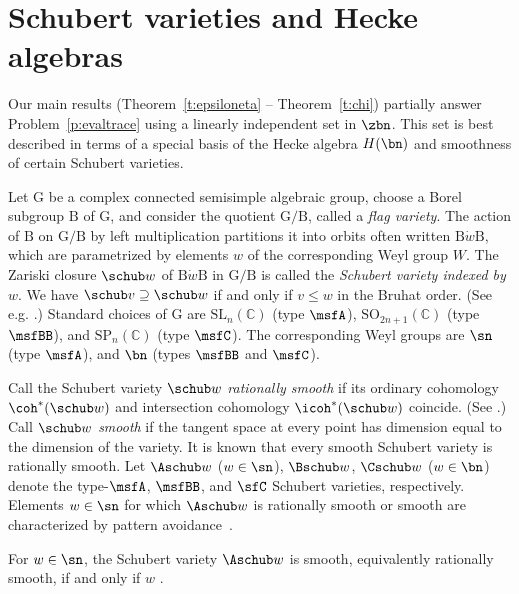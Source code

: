 \section{Schubert varieties and Hecke algebras}\label{s:schuberthecke}

Our main results (Theorem~\ref{t:epsiloneta} --
Theorem~\ref{t:chi})
partially answer
Problem~\ref{p:evaltrace} using a linearly independent set in $\zbn$.
This set is best described in terms of a special basis of the
Hecke algebra $H(\bn)$ and smoothness of certain Schubert varieties.


Let $\mathrm G$ be a complex connected semisimple algebraic group,
choose a Borel subgroup $\mathrm B$ of $\mathrm G$, and consider
the quotient
$\mathrm G/\mathrm B$,
called a {\em flag variety}.
The action of $\mathrm B$ on $\mathrm G/\mathrm B$ by left multiplication 
partitions
it
into orbits often written
$\mathrm B\dot w\mathrm B$,
which are
parametrized by elements $w$ of the corresponding Weyl group $W$.
The Zariski closure $\schub w$ of
$\mathrm B \dot w \mathrm B$
in $\mathrm G/\mathrm B$
is called the {\em Schubert variety indexed by $w$}.
We have
$\schub v \supseteq \schub w$ if and only if $v \leq w$ in the Bruhat order.
(See e.g. \cite[\S \,4.7]{BilleyLak}.)
Standard choices of $\mathrm G$
are
$\mathrm{SL}_n(\mathbb C)$
(type $\msfA$),
$\mathrm{SO}_{2n+1}(\mathbb C)$
(type $\msfBB$),
and $\mathrm{SP}_{n}(\mathbb C)$
(type $\msfC$).
The corresponding Weyl groups are $\sn$ (type $\msfA$), and
$\bn$
(types $\msfBB$ and $\msfC$).

Call the Schubert variety $\schub w$ {\em rationally smooth} if
its ordinary cohomology $\coh^*(\schub w)$ and
intersection cohomology $\icoh^*(\schub w)$ coincide.
(See \cite[Ch.\,6]{BilleyLak}.)
Call $\schub w$ {\em smooth} if the tangent space at every
point has dimension equal to the dimension of the variety.
It is known that every smooth
Schubert variety is rationally smooth.
Let $\Aschub w$ ($w \in \sn$), $\Bschub w$, $\Cschub w$ ($w \in \bn$)
denote the type-$\msfA$,
$\msfBB$, and
$\sfC$ Schubert varieties,
respectively.  Elements $w \in \sn$ for which $\Aschub w$ is rationally
smooth or smooth are characterized by pattern avoidance~\cite{LakSan}.
\begin{prop}\label{p:aavoid}
  For $w \in \sn$,
  the
  Schubert variety
  $\Aschub w$
  is smooth, equivalently rationally smooth,
  if and only if $w$ \avoidsp.
\end{prop}

